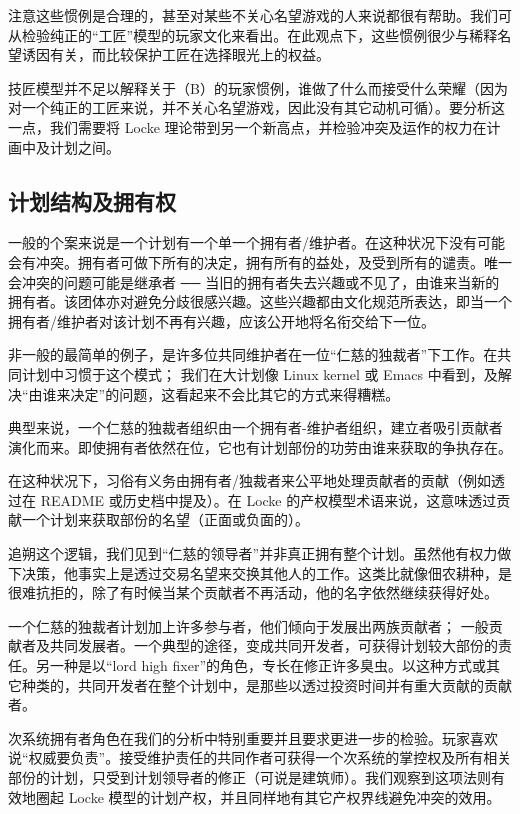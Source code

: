 注意这些惯例是合理的，甚至对某些不关心名望游戏的人来说都很有帮助。我们可从检验纯正的“工匠”模型的玩家文化来看出。在此观点下，这些惯例很少与稀释名望诱因有关，而比较保护工匠在选择眼光上的权益。

技匠模型并不足以解释关于（B）的玩家惯例，谁做了什么而接受什么荣耀（因为对一个纯正的工匠来说，并不关心名望游戏，因此没有其它动机可循）。要分析这一点，我们需要将 Locke 理论带到另一个新高点，并检验冲突及运作的权力在计画中及计划之间。

\subsection{计划结构及拥有权}
一般的个案来说是一个计划有一个单一个拥有者/维护者。在这种状况下没有可能会有冲突。拥有者可做下所有的决定，拥有所有的益处，及受到所有的谴责。唯一会冲突的问题可能是继承者  ──  当旧的拥有者失去兴趣或不见了，由谁来当新的拥有者。该团体亦对避免分歧很感兴趣。这些兴趣都由文化规范所表达，即当一个拥有者/维护者对该计划不再有兴趣，应该公开地将名衔交给下一位。

非一般的最简单的例子，是许多位共同维护者在一位“仁慈的独裁者”下工作。在共同计划中习惯于这个模式； 我们在大计划像 Linux kernel 或 Emacs 中看到，及解决“由谁来决定”的问题，这看起来不会比其它的方式来得糟糕。

典型来说，一个仁慈的独裁者组织由一个拥有者-维护者组织，建立者吸引贡献者演化而来。即使拥有者依然在位，它也有计划部份的功劳由谁来获取的争执存在。

在这种状况下，习俗有义务由拥有者/独裁者来公平地处理贡献者的贡献（例如透过在 README 或历史档中提及）。在 Locke 的产权模型术语来说，这意味透过贡献一个计划来获取部份的名望（正面或负面的）。

追朔这个逻辑，我们见到“仁慈的领导者”并非真正拥有整个计划。虽然他有权力做下决策，他事实上是透过交易名望来交换其他人的工作。这类比就像佃农耕种，是很难抗拒的，除了有时候当某个贡献者不再活动，他的名字依然继续获得好处。

一个仁慈的独裁者计划加上许多参与者，他们倾向于发展出两族贡献者； 一般贡献者及共同发展者。一个典型的途径，变成共同开发者，可获得计划较大部份的责任。另一种是以“lord high fixer”的角色，专长在修正许多臭虫。以这种方式或其它种类的，共同开发者在整个计划中，是那些以透过投资时间并有重大贡献的贡献者。

次系统拥有者角色在我们的分析中特别重要并且要求更进一步的检验。玩家喜欢说“权威要负责”。接受维护责任的共同作者可获得一个次系统的掌控权及所有相关部份的计划，只受到计划领导者的修正（可说是建筑师）。我们观察到这项法则有效地圈起 Locke 模型的计划产权，并且同样地有其它产权界线避免冲突的效用。

